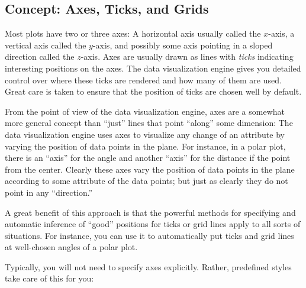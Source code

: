\subsection{Concept: Axes, Ticks, and Grids}

Most plots have two or three axes: A horizontal axis usually called the
$x$-axis, a vertical axis called the $y$-axis, and possibly some axis pointing
in a sloped direction called the $z$-axis. Axes are usually drawn as lines with
\emph{ticks} indicating interesting positions on the axes. The data
visualization engine gives you detailed control over where these ticks are
rendered and how many of them are used. Great care is taken to ensure that the
position of ticks are chosen well by default.

From the point of view of the data visualization engine, axes are a somewhat
more general concept than ``just'' lines that point ``along'' some dimension:
The data visualization engine uses axes to visualize any change of an attribute
by varying the position of data points in the plane. For instance, in a polar
plot, there is an ``axis'' for the angle and another ``axis'' for the distance
if the point from the center. Clearly these axes vary the position of data
points in the plane according to some attribute of the data points; but just as
clearly they do not point in any ``direction.''

A great benefit of this approach is that the powerful methods for specifying
and automatic inference of ``good'' positions for ticks or grid lines apply to
all sorts of situations. For instance, you can use it to automatically put
ticks and grid lines at well-chosen angles of a polar plot.

Typically, you will not need to specify axes explicitly. Rather, predefined
styles take care of this for you:
%
\begin{codeexample}[]
\end{codeexample}

\begin{codeexample}[]
\end{codeexample}

